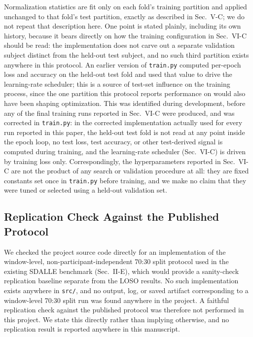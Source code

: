 \documentclass[conference]{IEEEtran}
\begin{document}
Normalization statistics are fit only on each fold's training
partition and applied unchanged to that fold's test partition,
exactly as described in Sec.~V-C; we do not repeat that description
here. One point is stated plainly, including its own history, because
it bears directly on how the training configuration in Sec.~VI-C
should be read: the implementation does not carve out a separate
validation subject distinct from the held-out test subject, and no
such third partition exists anywhere in this protocol. An earlier
version of \texttt{train.py} computed per-epoch loss and accuracy on
the held-out test fold and used that value to drive the
learning-rate scheduler; this is a source of test-set influence on
the training process, since the one partition this protocol reports
performance on would also have been shaping optimization. This was
identified during development, before any of the final training runs
reported in Sec.~VI-C were produced, and was corrected in
\texttt{train.py}: in the corrected implementation actually used for
every run reported in this paper, the held-out test fold is not read
at any point inside the epoch loop, no test loss, test accuracy, or
other test-derived signal is computed during training, and the
learning-rate scheduler (Sec.~VI-C) is driven by training loss only.
Correspondingly, the hyperparameters reported in Sec.~VI-C are not
the product of any search or validation procedure at all: they are
fixed constants set once in \texttt{train.py} before training, and we
make no claim that they were tuned or selected using a held-out
validation set.

\subsection{Replication Check Against the Published Protocol}
\label{subsec:replication-check}

We checked the project source code directly for an implementation of
the window-level, non-participant-independent 70:30 split protocol
used in the existing SDALLE benchmark \cite{farouk2026sdalle} (Sec.~II-E),
which would provide a sanity-check replication baseline separate
from the LOSO results. No such implementation exists anywhere in
\texttt{src/}, and no output, log, or saved artifact corresponding
to a window-level 70:30 split run was found anywhere in the project.
A faithful replication check against the published protocol was
therefore not performed in this project. We state this directly
rather than implying otherwise, and no replication result is
reported anywhere in this manuscript.
\end{document}
